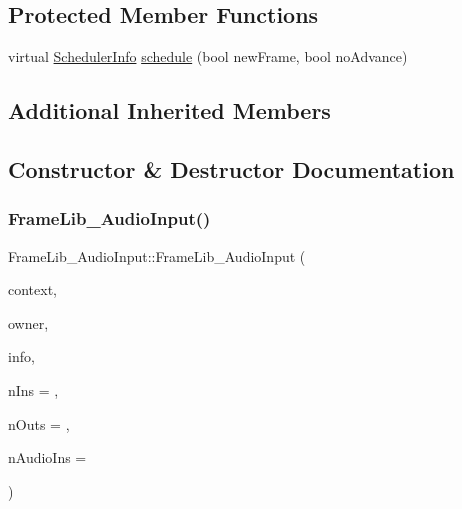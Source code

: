 \subsection*{Protected Member Functions}
\begin{DoxyCompactItemize}
\item 
virtual \hyperlink{struct_frame_lib___d_s_p_1_1_scheduler_info}{Scheduler\+Info} \hyperlink{class_frame_lib___audio_input_aaa16c1cb4486b196362b5edf1c60f689}{schedule} (bool new\+Frame, bool no\+Advance)
\end{DoxyCompactItemize}
\subsection*{Additional Inherited Members}


\subsection{Constructor \& Destructor Documentation}
\mbox{\label{class_frame_lib___audio_input_a5fcacfa38f33f949e76d046117835ace}} 
\subsubsection{\texorpdfstring{Frame\+Lib\+\_\+\+Audio\+Input()}{FrameLib\_AudioInput()}}
{\footnotesize\ttfamily Frame\+Lib\+\_\+\+Audio\+Input\+::\+Frame\+Lib\+\_\+\+Audio\+Input (\begin{DoxyParamCaption}\item[{\hyperlink{class_frame_lib___context}{Frame\+Lib\+\_\+\+Context}}]{context,  }\item[{void $\ast$}]{owner,  }\item[{\hyperlink{class_frame_lib___parameters_1_1_info}{Frame\+Lib\+\_\+\+Parameters\+::\+Info} $\ast$}]{info,  }\item[{unsigned long}]{n\+Ins = {},  }\item[{unsigned long}]{n\+Outs = {},  }\item[{unsigned long}]{n\+Audio\+Ins = {} }\end{DoxyParamCaption})\hspace{0.3cm}{\ttfamily [inline]}}



